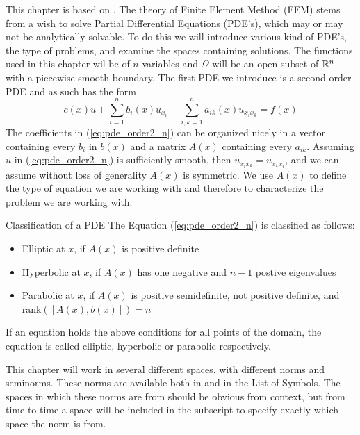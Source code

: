 This chapter is based on \cite{Braess}.
The theory of Finite Element Method (FEM) stems from a 
wish to solve Partial Differential Equations (PDE's),
which may or may not be analytically solvable. 
To do this we will introduce various kind of PDE's, 
the type of
problems, and examine the spaces containing solutions. 
The functions used in this chapter wil be of $n$ 
variables and $\Omega$ will be 
an open subset of $\mathbb{R}^n$ with a piecewise smooth boundary.
The first PDE we introduce is a second order PDE and as 
such has the form
\begin{equation}
	 c(x) u + \sum_{i=1}^{n}b_i(x)u_{x_{i}}
	- \sum_{i,k=1}^{n}a_{ik}(x)u_{x_i x_k}\label{eq:pde_order2_n}
	= f(x)
\end{equation}
The coefficients in (\ref*{eq:pde_order2_n}) can be 
organized nicely in a vector containing every $b_i$ 
in $b(x)$
and a matrix $A(x)$ containing every $a_{ik}$.
Assuming $u$ in (\ref*{eq:pde_order2_n}) is sufficiently 
smooth, then $u_{x_i x_k} =u_{x_k x_i} $, and we can 
assume without loss of generality $A(x)$ is 
symmetric. %
We use $A(x)$ to define the type of equation we are working 
with and therefore to characterize the problem we are 
working with.
\begin{defn}{Classification of a PDE}
	The Equation (\ref{eq:pde_order2_n}) is classified as follows:
	\begin{itemize}
		\item Elliptic at $x$, if $A(x)$ is positive definite
		\item Hyperbolic at $x$, if $A(x)$ has one negative and $n-1$ postive eigenvalues
		\item Parabolic at $x$, if $A(x)$ is positive semidefinite, not positive definite, and rank$([A(x), b(x)])=n$
	\end{itemize}
	If an equation holds the above conditions for all points of the domain, the equation is called elliptic, hyperbolic or parabolic respectively.
\end{defn}
This chapter will work in several different spaces, with different norms and 
seminorms. 
These norms are available both in \cite{Braess} and in the List of Symbols. 
The spaces in which these norms are from should be obvious from context, but from 
time to time a space will be included in the subscript to specify exactly which 
space the norm is from.
